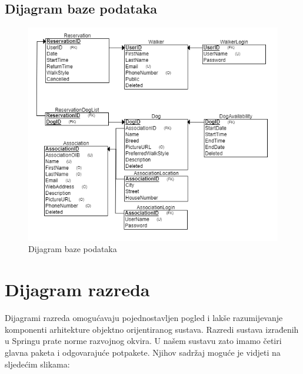 			
			\subsection{Dijagram baze podataka}
				
				\begin{figure}[H]
    			    \includegraphics[scale=1.2]{dijagrami/database-scheme.png}
    			    \centering
    			    \caption{Dijagram baze podataka}
    			    \label{fig:shema}
		        \end{figure}
			
			\eject
			
			
		\section{Dijagram razreda}
		
			Dijagrami razreda omogućavaju pojednostavljen pogled i lakše razumijevanje komponenti arhitekture objektno orijentiranog sustava. Razredi sustava izrađenih u Springu prate norme razvojnog okvira. U našem sustavu zato imamo četiri glavna paketa i odgovarajuće potpakete. Njihov sadržaj moguće je vidjeti na sljedećim slikama:
			
